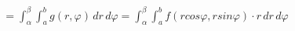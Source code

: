 \documentclass[preview]{standalone}
\begin{document}
\begin{align*}
&= \int_{\alpha}^{\beta} \int_{a}^{b} g(r, \varphi)\, dr\, d\varphi = \int_{\alpha}^{\beta} \int_{a}^{b} f(rcos\varphi, rsin\varphi)\cdot r\, dr\, d\varphi
\end{align*}
\end{document}
